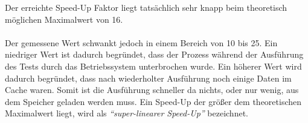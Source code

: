 
Der erreichte Speed-Up Faktor liegt tatsächlich sehr knapp beim theoretisch möglichen Maximalwert von 16. \\
\\
Der gemessene Wert schwankt jedoch in einem Bereich von 10 bis 25. Ein niedriger Wert ist dadurch begründet, dass der Prozess während der Ausführung des Tests durch das Betriebssystem unterbrochen wurde. Ein höherer Wert wird dadurch begründet, dass nach wiederholter Ausführung noch einige Daten im Cache waren. Somit ist die Ausführung schneller da nichts, oder nur wenig, aus dem Speicher geladen werden muss. Ein Speed-Up der größer dem theoretischen Maximalwert liegt, wird als \textit{``super-linearer Speed-Up''} bezeichnet.


